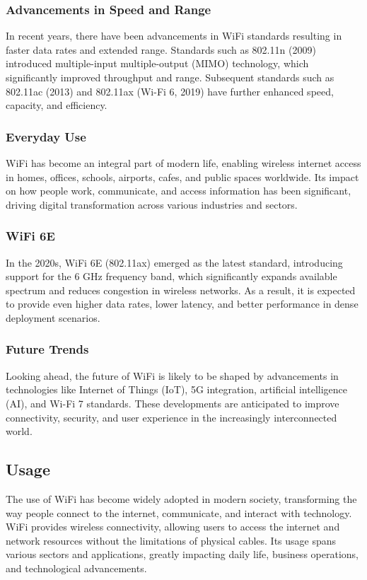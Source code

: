 \subsubsection{Advancements in Speed and Range}
In recent years, there have been advancements in WiFi standards resulting in faster data rates and extended range. Standards such as 802.11n (2009) introduced multiple-input multiple-output (MIMO) technology, which significantly improved throughput and range. Subsequent standards such as 802.11ac (2013) and 802.11ax (Wi-Fi 6, 2019) have further enhanced speed, capacity, and efficiency.

\subsubsection{Everyday Use}
WiFi has become an integral part of modern life, enabling wireless internet access in homes, offices, schools, airports, cafes, and public spaces worldwide. Its impact on how people work, communicate, and access information has been significant, driving digital transformation across various industries and sectors.

\subsubsection{WiFi 6E}
In the 2020s, WiFi 6E (802.11ax) emerged as the latest standard, introducing support for the 6 GHz frequency band, which significantly expands available spectrum and reduces congestion in wireless networks. As a result, it is expected to provide even higher data rates, lower latency, and better performance in dense deployment scenarios.

\subsubsection{Future Trends}
Looking ahead, the future of WiFi is likely to be shaped by advancements in technologies like Internet of Things (IoT), 5G integration, artificial intelligence (AI), and Wi-Fi 7 standards. These developments are anticipated to improve connectivity, security, and user experience in the increasingly interconnected world.

\subsection{Usage}
The use of WiFi has become widely adopted in modern society, transforming the way people connect to the internet, communicate, and interact with technology. WiFi provides wireless connectivity, allowing users to access the internet and network resources without the limitations of physical cables. Its usage spans various sectors and applications, greatly impacting daily life, business operations, and technological advancements.

